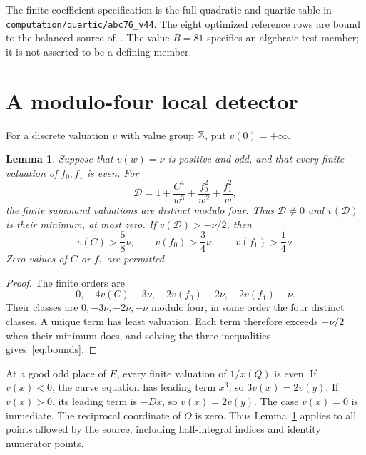 \documentclass[11pt,a4paper]{article}
\newtheorem{lemma}[theorem]{Lemma}
\theoremstyle{remark}\newtheorem{remark}[theorem]{Remark}
\begin{document}
The finite coefficient specification is the full quadratic and quartic
table in \nolinkurl{computation/quartic/abc76_v44}. The eight optimized
reference rows are bound to the balanced source of~\cite{Basis}.
The value $B=81$ specifies an algebraic test member; it is not asserted
to be a defining member.

\section{A modulo-four local detector}
For a discrete valuation $v$ with value group $\mathbb Z$, put $v(0)=+\infty$.

\begin{lemma}\label{lem:separation}
Suppose that $v(w)=\nu$ is positive and odd, and that every finite
valuation of $f_0,f_1$ is even. For
\begin{equation}\label{eq:factor}
 \mathcal D=1+\frac{C^4}{w^3}
                  +\frac{f_0^2}{w^2}+\frac{f_1^2}{w},
\end{equation}
the finite summand valuations are distinct modulo four. Thus
$\mathcal D\ne0$ and $v(\mathcal D)$ is their minimum, at most zero.
If $v(\mathcal D)>-\nu/2$, then
\begin{equation}\label{eq:bounds}
 v(C)>\frac58\nu,\qquad
 v(f_0)>\frac34\nu,\qquad
 v(f_1)>\frac14\nu.
\end{equation}
Zero values of $C$ or $f_1$ are permitted.
\end{lemma}
\begin{proof}
The finite orders are
\[
 0,\quad4v(C)-3\nu,\quad2v(f_0)-2\nu,\quad2v(f_1)-\nu.
\]
Their classes are $0,-3\nu,-2\nu,-\nu$ modulo four, in some order
the four distinct classes. A unique term has least valuation. Each
term therefore exceeds $-\nu/2$ when their minimum does, and solving
the three inequalities gives~\eqref{eq:bounds}.
\end{proof}

At a good odd place of $E$, every finite valuation of $1/x(Q)$ is
even. If $v(x)<0$, the curve equation has leading term $x^3$, so
$3v(x)=2v(y)$. If $v(x)>0$, its leading term is $-Dx$, so
$v(x)=2v(y)$. The case $v(x)=0$ is immediate. The reciprocal
coordinate of $O$ is zero. Thus Lemma~\ref{lem:separation} applies
to all points allowed by the source, including half-integral indices
and identity numerator points.
\end{document}
